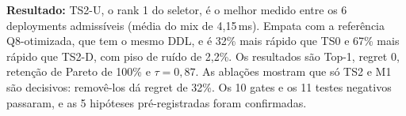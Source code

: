 \textbf{Resultado:} TS2-U, o rank 1 do seletor, é o melhor medido entre os 6 deployments admissíveis (média do mix de 4,15\,ms). Empata com a referência Q8-otimizada, que tem o mesmo DDL, e é 32\% mais rápido que TS0 e 67\% mais rápido que TS2-D, com piso de ruído de 2,2\%. Os resultados são Top-1, regret 0, retenção de Pareto de 100\% e $\tau=0{,}87$. As ablações mostram que só TS2 e M1 são decisivos: removê-los dá regret de 32\%. Os 10 gates e os 11 testes negativos passaram, e as 5 hipóteses pré-registradas foram confirmadas.
